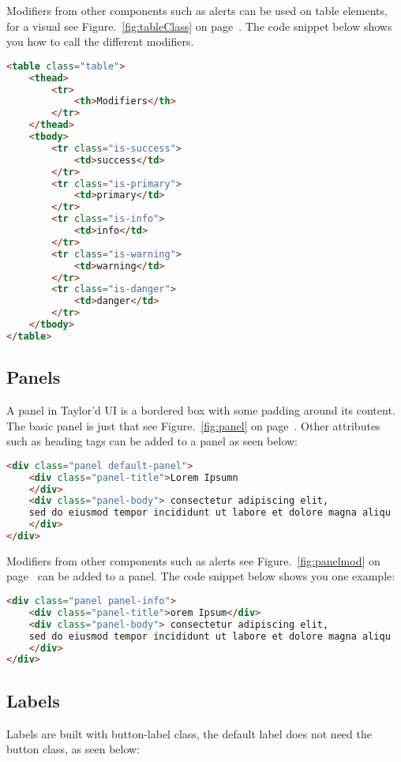Modifiers from other components such as alerts can be used on table elements, for a visual see Figure.~\ref{fig:tableClass} on  page~\pageref{fig:tableClass}. The code snippet below shows you how to call the different modifiers. 

\begin{lstlisting}[language=HTML]
<table class="table">
	<thead>
		<tr>
			<th>Modifiers</th>
		</tr>
	</thead>
	<tbody>
		<tr class="is-success">
			<td>success</td>
		</tr>
		<tr class="is-primary">
			<td>primary</td>
		</tr>
		<tr class="is-info">
			<td>info</td>
		</tr>
		<tr class="is-warning">
			<td>warning</td>
		</tr>
		<tr class="is-danger">
			<td>danger</td>
		</tr>
	</tbody>
</table>
\end{lstlisting}

\newpage
\subsection*{Panels}
A panel in Taylor'd UI is a bordered box with some padding around its content. The basic panel is just that see Figure.~\ref{fig:panel} on  page~\pageref{fig:panel}. Other attributes such as heading tags can be added to a panel as seen below: 

\begin{lstlisting}[language=HTML]
<div class="panel default-panel">
	<div class="panel-title">Lorem Ipsumn
	</div>
	<div class="panel-body"> consectetur adipiscing elit, 
	sed do eiusmod tempor incididunt ut labore et dolore magna aliqu
	</div>
</div>
\end{lstlisting}

Modifiers from other components such as alerts see Figure.~\ref{fig:panelmod} on  page~\pageref{fig:panelmod} can be added to a panel. The code snippet below shows you one example: 

\begin{lstlisting}[language=HTML]
<div class="panel panel-info">
	<div class="panel-title">orem Ipsum</div>
	<div class="panel-body"> consectetur adipiscing elit, 
	sed do eiusmod tempor incididunt ut labore et dolore magna aliqu
	</div>
</div>
\end{lstlisting}


\subsection*{Labels}

Labels are built with button-label class, the default label does not need the button class, as seen below: 

